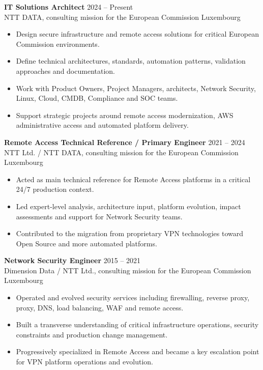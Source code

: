 \documentclass[10pt,a4paper]{article}
\newcommand{\role}[4]{
  \textbf{#1} \hfill {\color{muted}#2}\\
  {\color{muted}#3} \hfill {\color{muted}#4}
}
\begin{document}
\role{IT Solutions Architect}{2024 -- Present}{NTT DATA, consulting mission for the European Commission}{Luxembourg}
\begin{itemize}
  \item Design secure infrastructure and remote access solutions for critical European Commission environments.
  \item Define technical architectures, standards, automation patterns, validation approaches and documentation.
  \item Work with Product Owners, Project Managers, architects, Network Security, Linux, Cloud, CMDB, Compliance and SOC teams.
  \item Support strategic projects around remote access modernization, AWS administrative access and automated platform delivery.
\end{itemize}

\vspace{4pt}
\role{Remote Access Technical Reference / Primary Engineer}{2021 -- 2024}{NTT Ltd. / NTT DATA, consulting mission for the European Commission}{Luxembourg}
\begin{itemize}
  \item Acted as main technical reference for Remote Access platforms in a critical 24/7 production context.
  \item Led expert-level analysis, architecture input, platform evolution, impact assessments and support for Network Security teams.
  \item Contributed to the migration from proprietary VPN technologies toward Open Source and more automated platforms.
\end{itemize}

\vspace{4pt}
\role{Network Security Engineer}{2015 -- 2021}{Dimension Data / NTT Ltd., consulting mission for the European Commission}{Luxembourg}
\begin{itemize}
  \item Operated and evolved security services including firewalling, reverse proxy, proxy, DNS, load balancing, WAF and remote access.
  \item Built a transverse understanding of critical infrastructure operations, security constraints and production change management.
  \item Progressively specialized in Remote Access and became a key escalation point for VPN platform operations and evolution.
\end{itemize}
\end{document}
